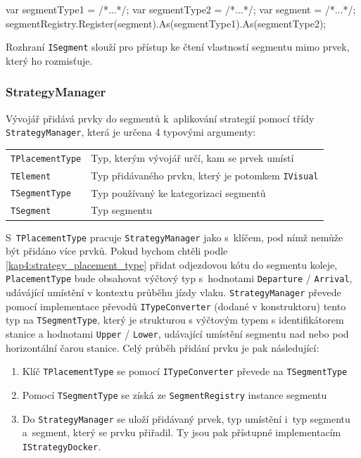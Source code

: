 \begin{csharpcode}
 var segmentType1 = /*...*/;
 var segmentType2 = /*...*/;
 var segment = /*...*/;
 segmentRegistry.Register(segment).As(segmentType1).As(segmentType2);
\end{csharpcode}

Rozhraní \texttt{ISegment} slouží pro přístup ke čtení vlastností segmentu mimo prvek, který ho rozmisťuje.

\subsubsection*{StrategyManager}
\label{kap4:strategy_manager}
Vývojář přidává prvky do segmentů k~aplikování strategií pomocí třídy \linebreak\texttt{StrategyManager}, která je určena 4 typovými argumenty:\newline

\hskip-1.0cm\renewcommand{}
\begin{tabular}{ m{} m{} }
\texttt{TPlacementType} & Typ, kterým vývojář určí, kam se prvek umístí \\ 
\texttt{TElement} & Typ přidávaného prvku, který je potomkem \texttt{IVisual} \\
\texttt{TSegmentType} & Typ používaný ke kategorizaci segmentů \\
\texttt{TSegment} & Typ segmentu \\
\end{tabular}
\newline
\newline
S~\texttt{TPlacementType} pracuje \texttt{StrategyManager} jako s~klíčem, pod nímž nemůže být přidáno více prvků. Pokud bychom chtěli podle \ref{kap4:strategy_placement_type} přidat odjezdovou kótu do segmentu koleje, \texttt{PlacementType} bude obsahovat výčtový typ s~hodnotami \texttt{Departure} / \texttt{Arrival}, udávájící umístění v kontextu průběhu jízdy vlaku. \texttt{StrategyManager} převede pomocí implementace převodů \texttt{ITypeConverter} (dodané v konstruktoru) tento typ na \texttt{TSegmentType}, který je strukturou s výčtovým typem s identifikátorem stanice a hodnotami \texttt{Upper} / \texttt{Lower}, udávající umístění segmentu nad nebo pod horizontální čarou stanice. Celý průběh přidání prvku je pak následující:

\begin{enumerate}
\item  Klíč \texttt{TPlacementType} se pomocí \texttt{ITypeConverter} převede \newline na \texttt{TSegmentType}
\item  Pomocí \texttt{TSegmentType} se získá ze \texttt{SegmentRegistry} instance segmentu
\item  Do \texttt{StrategyManager} se uloží přidávaný prvek, typ umístění i~typ segmentu a~segment, který se prvku přiřadil. Ty jsou pak přístupné implementacím \texttt{IStrategyDocker}.
\end{enumerate}

